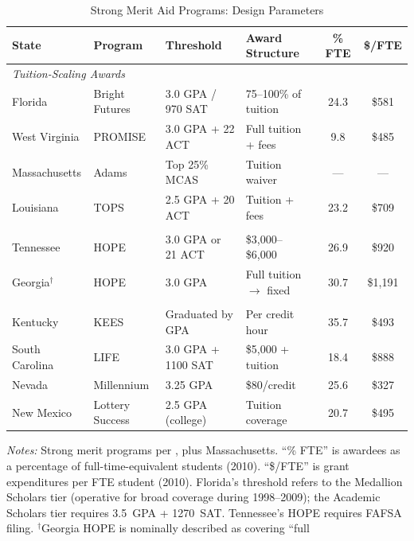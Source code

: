 \begin{table}[H]
\centering
\begin{threeparttable}
\caption{Strong Merit Aid Programs: Design Parameters}
\label{tab:programs}
\begin{tabular}{llllcc}
\toprule
State & Program & Threshold & Award Structure & \% FTE & \$/FTE \\
\midrule
\multicolumn{6}{l}{\textit{Tuition-Scaling Awards}} \\
\quad Florida & Bright Futures & 3.0 GPA / 970 SAT & 75--100\% of tuition & 24.3 & \$581 \\
\quad West Virginia & PROMISE & 3.0 GPA + 22 ACT & Full tuition + fees & 9.8 & \$485 \\
\quad Massachusetts & Adams & Top 25\% MCAS & Tuition waiver & --- & --- \\
\quad Louisiana & TOPS & 2.5 GPA + 20 ACT & Tuition + fees & 23.2 & \$709 \\
\addlinespace
\multicolumn{6}{l}{\textit{Fixed-Dollar Awards}} \\
\quad Tennessee & HOPE & 3.0 GPA or 21 ACT & \$3,000--\$6,000 & 26.9 & \$920 \\
\quad Georgia$^\dagger$ & HOPE & 3.0 GPA & Full tuition $\to$ fixed & 30.7 & \$1,191 \\
\addlinespace
\multicolumn{6}{l}{\textit{Other Strong Programs}} \\
\quad Kentucky & KEES & Graduated by GPA & Per credit hour & 35.7 & \$493 \\
\quad South Carolina & LIFE & 3.0 GPA + 1100 SAT & \$5,000 + tuition & 18.4 & \$888 \\
\quad Nevada & Millennium & 3.25 GPA & \$80/credit & 25.6 & \$327 \\
\quad New Mexico & Lottery Success & 2.5 GPA (college) & Tuition coverage & 20.7 & \$495 \\
\bottomrule
\end{tabular}
\begin{tablenotes}[flushleft]
\footnotesize
\item \textit{Notes:} Strong merit programs per \textcite{sjoquist2015state},
  plus Massachusetts. ``\% FTE'' is awardees as a percentage of
  full-time-equivalent students (2010). ``\$/FTE'' is grant expenditures per
  FTE student (2010). Florida's threshold refers to the Medallion Scholars
  tier (operative for broad coverage during 1998--2009); the Academic
  Scholars tier requires 3.5~GPA + 1270~SAT. Tennessee's HOPE requires
  FAFSA filing.
  $^\dagger$Georgia HOPE is nominally described as covering ``full

\end{tablenotes}
\end{threeparttable}
\end{table}
